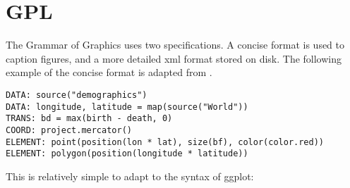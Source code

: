 \section{GPL}
\label{sec:translate-gpl}

The Grammar of Graphics uses two specifications.  A concise format is used to caption figures, and a more detailed xml format stored on disk.  The following example of the concise format is adapted from \citet[][Figure 1.5, page 13]{wilkinson:2006}.

\begin{verbatim}
DATA: source("demographics")
DATA: longitude, latitude = map(source("World"))
TRANS: bd = max(birth - death, 0)
COORD: project.mercator()
ELEMENT: point(position(lon * lat), size(bf), color(color.red))
ELEMENT: polygon(position(longitude * latitude))
\end{verbatim}

This is relatively simple to adapt to the syntax of ggplot:

